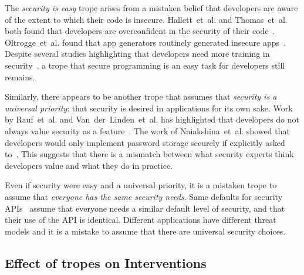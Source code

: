 \documentclass[conference]{IEEEtran}
\newcommand{\etal}[0]{et~al{.}}
\begin{document}
The \emph{security is easy} trope arises from a mistaken belief that developers are aware of the extent to which their code is insecure.  Hallett~\etal{} and Thomas~\etal{} both found that developers are overconfident in the security of their code~\cite{joseph2021,thomas2018}. Oltrogge~\etal{} found that app generators routinely generated insecure apps~\cite{oltrogge2018rise}.  Despite several studies highlighting that developers need more training in security~\cite{thomas2018,emmasurface2020}, a trope that secure programming is an easy task for developers still remains.

Similarly, there appears to be another trope that assumes that \emph{security is a universal priority}: that security is desired in applications for its own sake.  Work by Rauf~\etal{} and Van~der~Linden~\etal{} has highlighted that developers do not always value security as a feature~\cite{linden2019,linden2020,irum2020}. The work of Naiakshina~\etal{} showed that developers would only implement password storage securely if explicitly asked to~\cite{naiakshina2019}.  This suggests that there is a mismatch between what security experts think developers value and what they do in practice.

Even if security were easy and a universal priority, it is a mistaken trope to assume that \emph{everyone has the same security needs}.  Same defaults for security APIs~\cite{smithgreen2016} assume that everyone needs a similar default level of security, and that their use of the API is identical.  Different applications have different threat models and it is a mistake to assume that there are universal security choices.

\subsection{Effect of tropes on Interventions}  
\end{document}
